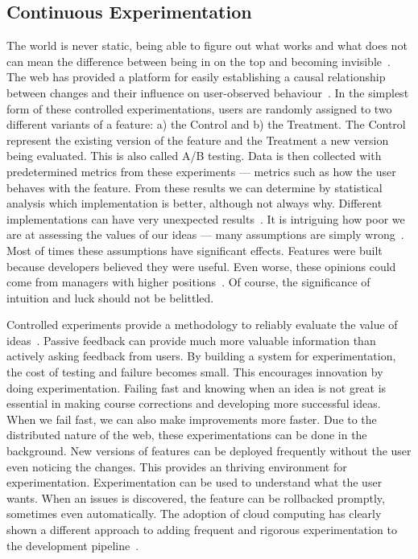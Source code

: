 \documentclass[english]{tktltiki2}
\begin{document}
\subsection{Continuous Experimentation}

The world is never static, being able to figure out what works and what does not can mean the difference between being in on the top and becoming invisible~\cite{KLS09}. The web has provided a platform for easily establishing a causal relationship between changes and their influence on user-observed behaviour~\cite{KLS09}. In the simplest form of these controlled experimentations, users are randomly assigned to two different variants of a feature: a) the Control and b) the Treatment. The Control represent the existing version of the feature and the Treatment a new version being evaluated. This is also called A/B testing. Data is then collected with predetermined metrics from these experiments — metrics such as how the user behaves with the feature. From these results we can determine by statistical analysis which implementation is better, although not always why. Different implementations can have very unexpected results~\cite{KLS09, KDF12}. It is intriguing how poor we are at assessing the values of our ideas — many assumptions are simply wrong~\cite{KDF12}. Most of times these assumptions have significant effects. Features were built because developers believed they were useful. Even worse, these opinions could come from managers with higher positions~\cite{KLS09, Bos12}. Of course, the significance of intuition and luck should not be belittled.

Controlled experiments provide a methodology to reliably evaluate the value of ideas~\cite{KLS09}. Passive feedback can provide much more valuable information than actively asking feedback from users. By building a system for experimentation, the cost of testing and failure becomes small. This encourages innovation by doing experimentation. Failing fast and knowing when an idea is not great is essential in making course corrections and developing more successful ideas. When we fail fast, we can also make improvements more faster. Due to the distributed nature of the web, these experimentations can be done in the background. New versions of features can be deployed frequently without the user even noticing the changes. This provides an thriving environment for experimentation. Experimentation can be used to understand what the user wants. When an issues is discovered, the feature can be rollbacked promptly, sometimes even automatically. The adoption of cloud computing has clearly shown a different approach to adding frequent and rigorous experimentation to the development pipeline~\cite{Bos12}.
\end{document}
